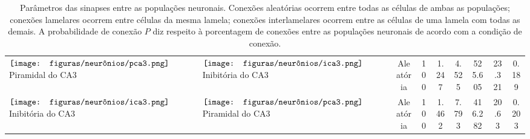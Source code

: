 \begin{table}[h!]
{\begin{tabular}{llccccccc}
$\vcenter{\hbox{\texttt{[image: figuras/neurônios/pca3.png]}}}$ Piramidal do CA3 & $\vcenter{\hbox{\texttt{[image: figuras/neurônios/ica3.png]}}}$ Inibitória do CA3 & Aleatória & 100 & 1.247 & 4.525 & 525.605 & 23.321 & 0.189 \\
$\vcenter{\hbox{\texttt{[image: figuras/neurônios/ica3.png]}}}$ Inibitória do CA3 & $\vcenter{\hbox{\texttt{[image: figuras/neurônios/pca3.png]}}}$ Piramidal do CA3 & Aleatória & 100 & 1.462 & 7.793 & 416.282 & 20.63 & 0.203 \\
\bottomrule
\end{tabular}}
\caption{Parâmetros das sinapses entre as populações neuronais. Conexões aleatórias ocorrem entre todas as células
              de ambas as populações; conexões lamelares ocorrem entre células da mesma lamela; conexões interlamelares ocorrem
              entre as células de uma lamela com todas as demais. A probabilidade de conexão $P$ diz respeito à porcentagem de
              conexões entre as populações neuronais de acordo com a condição de conexão.}
\label{tab:synapse_params}
\end{table}

